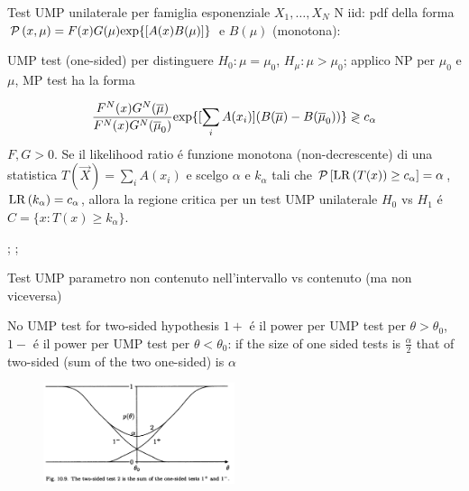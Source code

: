 \documentclass[asd-beamer.tex]{subfiles}%
\begin{document}
\begin{frame}{Test UMP unilaterale per famiglia esponenziale}\frameintoc{}
$X_1,\ldots,X_N$ N iid: pdf della forma $\operatorname{\mathcal{P}}{(x,\mu)}=F(x)G(\mu)\text{exp}\{[A(x)B(\mu)]\}$ e $B(\mu)$ (monotona):

UMP test (one-sided) per distinguere $H_0: \mu=\mu_0$, $H_{\mu}: \mu>\mu_0$; applico NP per $\mu_0$ e $\mu$, MP test ha la forma

\[\frac{F^N(x)G^N(\overline{\mu})}{F^N(x)G^N(\overline{\mu}_0)}\text{exp}\{[\sum_iA(x_i)](B(\overline{\mu})-B(\overline{\mu}_0))\}\gtrless c_{\alpha}\]
$F,G>0$.
Se il likelihood ratio \'e funzione monotona (non-decrescente) di una statistica $T(\vec{X})=\sum_iA(x_i)$ e scelgo $\alpha$ e $k_{\alpha}$ tali che $\operatorname{\mathcal{P}}{[\operatorname{LR}{(T(x))}\geq c_{\alpha}]}=\alpha$, $\operatorname{LR}{(k_{\alpha})}=c_{\alpha}$,  allora la regione critica per un test UMP unilaterale $H_0$ vs $H_1$ \'e $C=\{x:T(x)\geq k_{\alpha}\}$.

\cite[5]{lrtmptumpt}; \cite[445]{inferencemukhopadhyay2000}; \cite[sec 3.6]{lehmann2006testing}
\end{frame}

\begin{frame}{Test UMP parametro non contenuto nell'intervallo vs contenuto (ma non viceversa)}

\cite[269]{james2006statistical}\cite[sec 3.7]{lehmann2006testing}
\end{frame}

\begin{wordonframe}{No UMP test for two-sided hypothesis}
$1+$ \'e il power per UMP test per $\theta>\theta_0$, $1-$ \'e il power per UMP test per $\theta<\theta_0$: if the size of one sided tests is $\frac{\alpha}{2}$ that of two-sided (sum of the two one-sided) is $\alpha$
\begin{figure}[!ht]
\includegraphics[trim={0cm 0cm 0 0},clip, keepaspectratio,width=0.5\textwidth]{figures/james/test/oneone2sided}
\label{fig:oneone2sided}
\end{figure}
\end{wordonframe}
\end{document}
